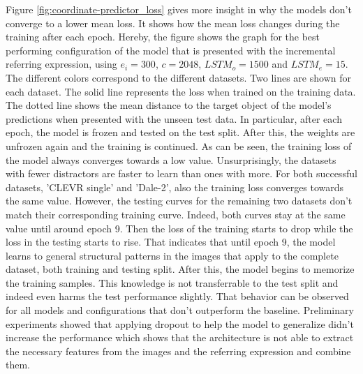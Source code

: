 Figure \ref{fig:coordinate-predictor_loss} gives more insight in why the models don't converge to a lower mean loss.
It shows how the mean loss changes during the training after each epoch.
Hereby, the figure shows the graph for the best performing configuration of the model that is presented with the incremental referring expression, using $e_i=300$, $c=2048$, $LSTM_o=1500$ and $LSTM_e=15$.
The different colors correspond to the different datasets.
Two lines are shown for each dataset.
The solid line represents the loss when trained on the training data.
The dotted line shows the mean distance to the target object of the model's predictions when presented with the unseen test data.
In particular, after each epoch, the model is frozen and tested on the test split.
After this, the weights are unfrozen again and the training is continued.
As can be seen, the training loss of the model always converges towards a low value.
Unsurprisingly, the datasets with fewer distractors are faster to learn than ones with more.
For both successful datasets, 'CLEVR single' and 'Dale-2', also the training loss converges towards the same value.
However, the testing curves for the remaining two datasets don't match their corresponding training curve.
Indeed, both curves stay at the same value until around epoch 9.
Then the loss of the training starts to drop while the loss in the testing starts to rise.
That indicates that until epoch 9, the model learns to general structural patterns in the images that apply to the complete dataset, both training and testing split.
After this, the model begins to memorize the training samples.
This knowledge is not transferrable to the test split and indeed even harms the test performance slightly.
That behavior can be observed for all models and configurations that don't outperform the baseline.
Preliminary experiments showed that applying dropout to help the model to generalize didn't increase the performance which shows that the architecture is not able to extract the necessary features from the images and the referring expression and combine them.


